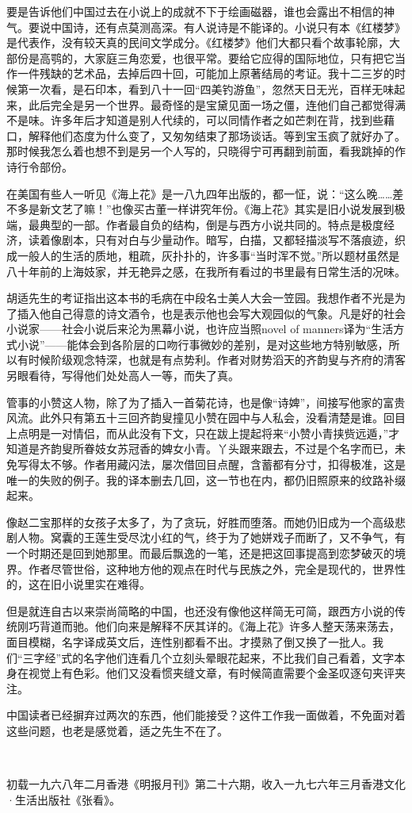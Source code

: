 \par 要是告诉他们中国过去在小说上的成就不下于绘画磁器，谁也会露出不相信的神气。要说中国诗，还有点莫测高深。有人说诗是不能译的。小说只有本《红楼梦》是代表作，没有较天真的民间文学成分。《红楼梦》他们大都只看个故事轮廓，大部份是高鹗的，大家庭三角恋爱，也很平常。要给它应得的国际地位，只有把它当作一件残缺的艺术品，去掉后四十回，可能加上原著结局的考证。我十二三岁的时候第一次看，是石印本，看到八十一回“四美钓游鱼”，忽然天日无光，百样无味起来，此后完全是另一个世界。最奇怪的是宝黛见面一场之僵，连他们自己都觉得满不是味。许多年后才知道是别人代续的，可以同情作者之如芒刺在背，找到些藉口，解释他们态度为什么变了，又匆匆结束了那场谈话。等到宝玉疯了就好办了。那时候我怎么着也想不到是另一个人写的，只晓得宁可再翻到前面，看我跳掉的作诗行令部份。
\par 在美国有些人一听见《海上花》是一八九四年出版的，都一怔，说：“这么晚……差不多是新文艺了嘛！”也像买古董一样讲究年份。《海上花》其实是旧小说发展到极端，最典型的一部。作者最自负的结构，倒是与西方小说共同的。特点是极度经济，读着像剧本，只有对白与少量动作。暗写，白描，又都轻描淡写不落痕迹，织成一般人的生活的质地，粗疏，灰扑扑的，许多事“当时浑不觉。”所以题材虽然是八十年前的上海妓家，并无艳异之感，在我所有看过的书里最有日常生活的况味。
\par 胡适先生的考证指出这本书的毛病在中段名士美人大会一笠园。我想作者不光是为了插入他自己得意的诗文酒令，也是表示他也会写大观园似的气象。凡是好的社会小说家——社会小说后来沦为黑幕小说，也许应当照novel of manners译为“生活方式小说”——能体会到各阶层的口吻行事微妙的差别，是对这些地方特别敏感，所以有时候阶级观念特深，也就是有点势利。作者对财势滔天的齐韵叟与齐府的清客另眼看待，写得他们处处高人一等，而失了真。
\par 管事的小赞这人物，除了为了插入一首菊花诗，也是像“诗婢”，间接写他家的富贵风流。此外只有第五十三回齐韵叟撞见小赞在园中与人私会，没看清楚是谁。回目上点明是一对情侣，而从此没有下文，只在跋上提起将来“小赞小青挟赀远遁，”才知道是齐韵叟所眷妓女苏冠香的婢女小青。丫头跟来跟去，不过是个名字而已，未免写得太不够。作者用藏闪法，屡次借回目点醒，含蓄都有分寸，扣得极准，这是唯一的失败的例子。我的译本删去几回，这一节也在内，都仍旧照原来的纹路补缀起来。
\par 像赵二宝那样的女孩子太多了，为了贪玩，好胜而堕落。而她仍旧成为一个高级悲剧人物。窝囊的王莲生受尽沈小红的气，终于为了她姘戏子而断了，又不争气，有一个时期还是回到她那里。而最后飘逸的一笔，还是把这回事提高到恋梦破灭的境界。作者尽管世俗，这种地方他的观点在时代与民族之外，完全是现代的，世界性的，这在旧小说里实在难得。
\par 但是就连自古以来崇尚简略的中国，也还没有像他这样简无可简，跟西方小说的传统刚巧背道而驰。他们向来是解释不厌其详的。《海上花》许多人整天荡来荡去，面目模糊，名字译成英文后，连性别都看不出。才摸熟了倒又换了一批人。我们“三字经”式的名字他们连看几个立刻头晕眼花起来，不比我们自己看着，文字本身在视觉上有色彩。他们又没看惯夹缝文章，有时候简直需要个金圣叹逐句夹评夹注。
\par 中国读者已经摒弃过两次的东西，他们能接受？这件工作我一面做着，不免面对着这些问题，也老是感觉着，适之先生不在了。
\par  
\par *初载一九六八年二月香港《明报月刊》第二十六期，收入一九七六年三月香港文化·生活出版社《张看》。



